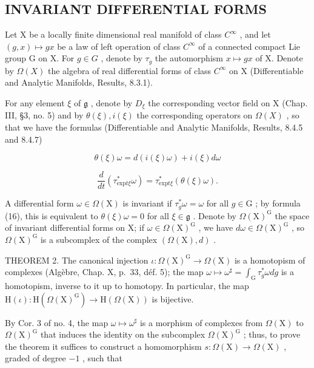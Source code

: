 \subsection{INVARIANT DIFFERENTIAL FORMS}

Let X be a locally finite dimensional real manifold of class \(C^{\infty}\) , and let \((g, x) \mapsto gx\) be a law of left operation of class \(C^{\infty}\) of a connected compact Lie group G on X. For \(g \in G\) , denote by \(\tau_{g}\) the automorphism \(x \mapsto gx\) of X. Denote by \(\Omega(X)\) the algebra of real differential forms of class \(C^{\infty}\) on X (Differentiable and Analytic Manifolds, Results, 8.3.1).

For any element \(\xi\) of \(\mathfrak{g}\) , denote by \(D_{\xi}\) the corresponding vector field on X (Chap. III, §3, no. 5) and by \(\theta(\xi), i(\xi)\) the corresponding operators on \(\Omega(X)\) , so that we have the formulas (Differentiable and Analytic Manifolds, Results, 8.4.5 and 8.4.7)

\[
\theta (\xi) \omega = d (i (\xi) \omega) + i (\xi) d \omega\tag{15}
\]

\[
\frac {d}{d t} (\tau_ {\mathrm{exp} t \xi} ^ {*} \omega) = \tau_ {\mathrm{exp} t \xi} ^ {*} (\theta (\xi) \omega).\tag{16}
\]

A differential form \(\omega \in \Omega(\mathrm{X})\) is invariant if \(\tau_g^*\omega = \omega\) for all \(g \in \mathrm{G}\) ; by formula (16), this is equivalent to \(\theta(\xi)\omega = 0\) for all \(\xi \in \mathfrak{g}\) . Denote by \(\Omega(\mathrm{X})^{\mathrm{G}}\) the space of invariant differential forms on X; if \(\omega \in \Omega(\mathrm{X})^{\mathrm{G}}\) , we have \(d\omega \in \Omega(\mathrm{X})^{\mathrm{G}}\) , so \(\Omega(\mathrm{X})^{\mathrm{G}}\) is a subcomplex of the complex \((\Omega(\mathrm{X}), d)\) .

THEOREM 2. The canonical injection \(\iota : \Omega(\mathrm{X})^{\mathrm{G}} \to \Omega(\mathrm{X})\) is a homotopism of complexes (Algèbre, Chap. X, p.~33, déf. 5); the map \(\omega \mapsto \omega^{\sharp} = \int_{\mathrm{G}} \tau_g^* \omega dg\) is a homotopism, inverse to it up to homotopy. In particular, the map \(\mathrm{H}(\iota) : \mathrm{H}(\Omega(\mathrm{X})^{\mathrm{G}}) \to \mathrm{H}(\Omega(\mathrm{X}))\) is bijective.

By Cor. 3 of no. 4, the map \(\omega \mapsto \omega^{\sharp}\) is a morphism of complexes from \(\Omega(\mathrm{X})\) to \(\Omega(\mathrm{X})^{\mathrm{G}}\) that induces the identity on the subcomplex \(\Omega(\mathrm{X})^{\mathrm{G}}\) ; thus, to prove the theorem it suffices to construct a homomorphism \(s: \Omega(\mathrm{X}) \to \Omega(\mathrm{X})\) , graded of degree \(-1\) , such that

